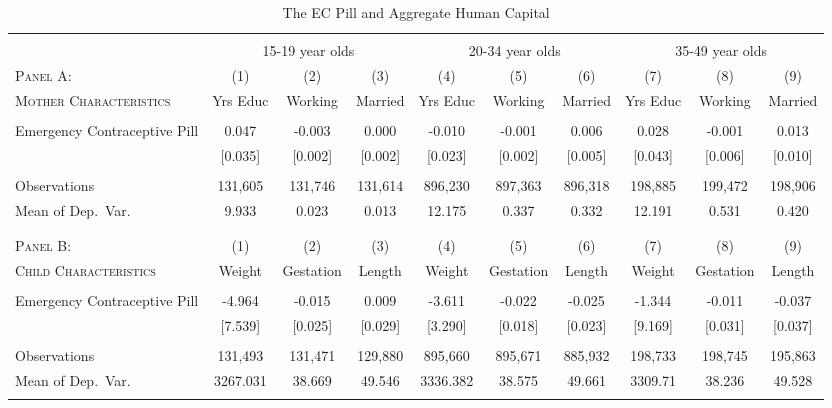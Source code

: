 \begin{landscape}\begin{table}[htpb!]\centering
\caption{The EC Pill and Aggregate Human Capital} \label{TEENtab:PillAgg}
\begin{tabular}{@{\extracolsep{5pt}}lccccccccc} \\
[-1.8ex]\hline\hline \\[-1.8ex] &\multicolumn{3}{c}{15-19 year olds} &\multicolumn{3}{c}{20-34 year olds} &\multicolumn{3}{c}{35-49 year olds} \\
\cmidrule(r){2-4} \cmidrule(r){5-7} \cmidrule(r){8-10}
\textsc{Panel A:}&(1)&(2)&(3)&(4)&(5)&(6)&(7)&(8)&(9) \\
\textsc{Mother Characteristics} & Yrs Educ & Working & Married& Yrs Educ & Working & Married & Yrs Educ & Working & Married\\ \midrule
 & & & & & & & & & \\
Emergency Contraceptive Pill & 0.047&-0.003&0.000&-0.010 &-0.001& 0.006&0.028& -0.001& 0.013 \\
&[0.035]& [0.002] &[0.002]&[0.023] &[0.002] &[0.005]&[0.043] &[0.006]& [0.010] \\
 & & & & & & & & & \\
Observations & 131,605& 131,746& 131,614&896,230& 897,363& 896,318&198,885& 199,472& 198,906\\
Mean of Dep.\ Var. & 9.933 &0.023& 0.013&12.175& 0.337& 0.332&12.191& 0.531& 0.420 \\
 & & & & & & & & & \\
 & & & & & & & & & \\ \midrule
\textsc{Panel B:}&(1)&(2)&(3)&(4)&(5)&(6)&(7)&(8)&(9) \\
\textsc{Child Characteristics} & Weight & Gestation & Length& Weight & Gestation & Length & Weight & Gestation & Length\\ \midrule
 & & & & & & & & & \\
Emergency Contraceptive Pill & -4.964& -0.015& 0.009&-3.611& -0.022 &-0.025&-1.344 &-0.011& -0.037\\
& [7.539]& [0.025]& [0.029]&[3.290]& [0.018]& [0.023]&[9.169] &[0.031] &[0.037] \\
 & & & & & & & & & \\
Observations & 131,493 &131,471 &129,880&895,660 &895,671 &885,932&198,733& 198,745& 195,863\\
Mean of Dep.\ Var. & 3267.031& 38.669& 49.546&3336.382& 38.575& 49.661&3309.71& 38.236& 49.528 \\ \hline \hline \\[-1.8ex]

\end{tabular}
\end{table}
\end{landscape}
